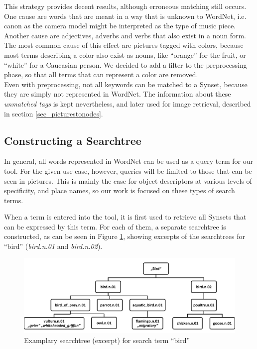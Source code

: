 This strategy provides decent results, although erroneous matching still occurs. One cause are words that are meant in a way that is unknown to WordNet, i.e. canon as the camera model might be interpreted as the type of music piece. Another cause are adjectives, adverbs and verbs that also exist in a noun form. The most common cause of this effect are pictures tagged with colors, because most terms describing a color also exist as nouns, like ``orange'' for the fruit, or ``white'' for a Caucasian person. We decided to add a filter to the preprocessing phase, so that all terms that can represent a color are removed. \\

Even with preprocessing, not all keywords can be matched to a Synset, because they are simply not represented in WordNet. The information about these \emph{unmatched tags} is kept nevertheless, and later used for image retrieval, described in section \ref{sec_picturestonodes}.


\subsection{Constructing a Searchtree}
\label{sec_searchtreeconstruction}
In general, all words represented in WordNet can be used as a query term for our tool.  For the given use case, however, queries will be limited to those that can be seen in pictures. This is mainly the case for object descriptors at various levels of specificity, and place names, so our work is focused on these types of search terms.

When a term is entered into the tool, it is first used to retrieve all Synsets that can be expressed by this term. For each of them, a separate searchtree is constructed, as can be seen in Figure \ref{fig_searchtree}, showing excerpts of the searchtrees for ``bird'' (\emph{bird.n.01} and \emph{bird.n.02}).

\begin{figure}[h]
\includegraphics[width=\textwidth]{images/searchtree.pdf}
\caption{Examplary searchtree (excerpt) for search term ``bird''}
\label{fig_searchtree}
\end{figure}

